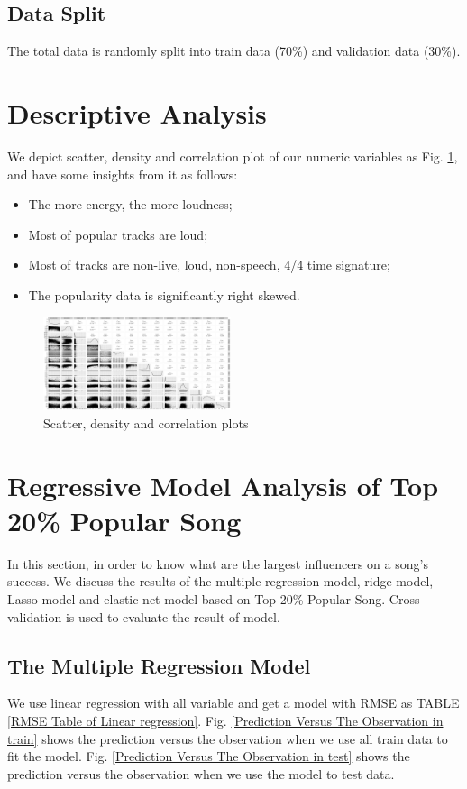 \documentclass[conference]{IEEEtran}
\begin{document}
\subsection{Data Split}
The total data is randomly split into train data (70\%) and validation data (30\%).

\section{Descriptive Analysis} 
We depict scatter, density and correlation plot of our numeric variables as Fig. \ref{ggpairs.pdf}, and have some insights from it as follows:
\begin{itemize}
  \item The more energy, the more loudness;
  \item Most of popular tracks are loud;
  \item Most of tracks are non-live, loud, non-speech, 4/4 time signature;
  \item The popularity data is significantly right skewed.
\end{itemize}


\begin{figure}[htbp]
\centerline{\includegraphics[width=0.49\textwidth]{figure/ggpairs.png}}
\caption{Scatter, density and correlation plots}
\label{ggpairs.pdf}
\end{figure}

\section{Regressive Model Analysis of Top 20\% Popular Song}
In this section, in order to know what are the largest influencers on a song’s success. We discuss the results of the multiple regression model, ridge model, Lasso model and elastic-net model based on Top 20\% Popular Song. Cross validation is used to evaluate the result of model.


\subsection{The Multiple Regression Model}\label{The Multiple Regression Model}
We use linear regression with all variable and get a model with RMSE as TABLE \ref{RMSE Table of Linear regression}. Fig. \ref{Prediction Versus The Observation in train} shows the prediction versus the observation when we use all train data to fit the model. Fig. \ref{Prediction Versus The Observation in test} shows the prediction versus the observation when we use the model to test data. 
\end{document}
